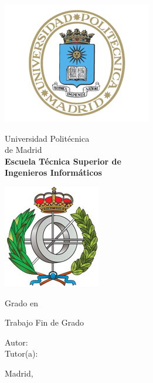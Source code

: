 \begin{titlepage}

\begin{minipage}{0.15\linewidth}
\hspace*{-2.5cm}
\noindent
\includegraphics[scale=0.5]{include/EscUpm.png} \qquad\qquad
\end{minipage}
\begin{minipage}{0.7\linewidth}
\begin{center}
\huge{ Universidad Politécnica\\de Madrid }\\
\vspace*{0.5cm}
\Large{\textbf{Escuela Técnica Superior de \\
Ingenieros Informáticos}}
\end{center}
\end{minipage}
\begin{minipage}{0.2\linewidth}
\includegraphics[scale=0.5]{include/FacInformatica.png} 
\end{minipage}

\vspace*{1cm}
\begin{center}
\Large{Grado en  \Grado{} }
\end{center}

\vspace*{1cm}
\begin{center}
\huge{ Trabajo Fin de Grado }
\end{center}

\vspace*{0.5cm}
\begin{center}
\huge\bfseries {  \TituloTFG{} } 
\end{center}

\vspace*{5cm}

\noindent
\large{Autor: \NombreAutor{} }\\
\large{Tutor(a): \NombreTutor{} }


\vspace*{3cm}
\begin{center}
Madrid, \Fecha
\end{center}

\end{titlepage}
